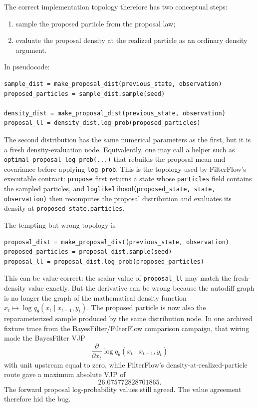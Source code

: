 The correct implementation topology therefore has two conceptual steps:
\begin{enumerate}[label=(\roman*)]
  \item sample the proposed particle from the proposal law;
  \item evaluate the proposal density at the realized particle as an ordinary
    density argument.
\end{enumerate}
In pseudocode:
\begin{verbatim}
sample_dist = make_proposal_dist(previous_state, observation)
proposed_particles = sample_dist.sample(seed)

density_dist = make_proposal_dist(previous_state, observation)
proposal_ll = density_dist.log_prob(proposed_particles)
\end{verbatim}
The second distribution has the same numerical parameters as the first, but it
is a fresh density-evaluation node.  Equivalently, one may call a helper such
as \texttt{optimal\_proposal\_log\_prob(...)} that rebuilds the proposal mean
and covariance before applying \texttt{log\_prob}.  This is the topology used
by FilterFlow's executable contract: \texttt{propose} first returns a state
whose \texttt{particles} field contains the sampled particles, and
\texttt{loglikelihood(proposed\_state, state, observation)} then recomputes
the proposal distribution and evaluates its density at
\texttt{proposed\_state.particles}.

The tempting but wrong topology is
\begin{verbatim}
proposal_dist = make_proposal_dist(previous_state, observation)
proposed_particles = proposal_dist.sample(seed)
proposal_ll = proposal_dist.log_prob(proposed_particles)
\end{verbatim}
This can be value-correct: the scalar value of \texttt{proposal\_ll} may match
the fresh-density value exactly.  But the derivative can be wrong because the
autodiff graph is no longer the graph of the mathematical density function
$x_t\mapsto \log q_\theta(x_t\mid x_{t-1},y_t)$.  The proposed particle is now
also the reparameterized sample produced by the same distribution node.  In one archived
fixture trace from the BayesFilter/FilterFlow comparison campaign, that wiring
made the BayesFilter VJP
\[
  \frac{\partial}{\partial x_t}\log q_\theta(x_t\mid x_{t-1},y_t)
\]
with unit upstream equal to zero, while FilterFlow's density-at-realized-particle
route gave a maximum absolute VJP of
\[
  26.075772828701865 .
\]
The forward proposal log-probability values still agreed.  The value agreement
therefore hid the bug.

